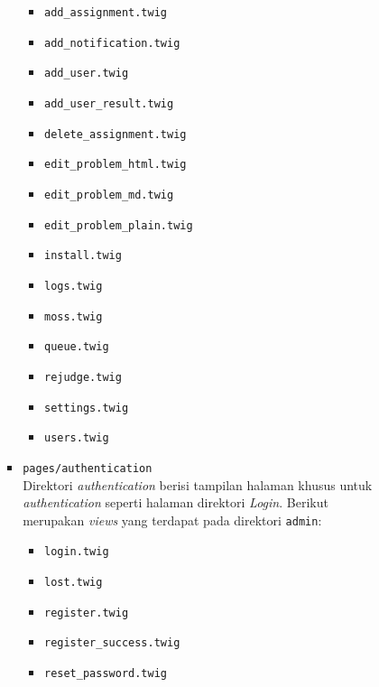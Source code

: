 \documentclass[a4paper,twoside]{article}
\begin{document}
\begin{enumerate}
\begin{itemize}
\begin{itemize}
\begin{itemize}
				                        \begin{itemize}
					                        \item \verb|add_assignment.twig|
					                        \item \verb|add_notification.twig|
					                        \item \verb|add_user.twig|
					                        \item \verb|add_user_result.twig|
					                        \item \verb|delete_assignment.twig|
					                        \item \verb|edit_problem_html.twig|
					                        \item \verb|edit_problem_md.twig|
					                        \item \verb|edit_problem_plain.twig|
					                        \item \verb|install.twig|
					                        \item \verb|logs.twig|
					                        \item \verb|moss.twig|
					                        \item \verb|queue.twig|
					                        \item \verb|rejudge.twig|
					                        \item \verb|settings.twig|
					                        \item \verb|users.twig|
				                        \end{itemize}

				                  \item \verb|pages/authentication| \\
				                        Direktori \textit{authentication} berisi tampilan halaman khusus untuk \textit{authentication} seperti halaman direktori \textit{Login}. Berikut merupakan \textit{views} yang terdapat pada direktori \verb|admin|:

				                        \begin{itemize}
					                        \item \verb|login.twig|
					                        \item \verb|lost.twig|
					                        \item \verb|register.twig|
					                        \item \verb|register_success.twig|
					                        \item \verb|reset_password.twig|
				                        \end{itemize}


\end{itemize}
\end{itemize}
\end{itemize}
\end{enumerate}
\end{document}

